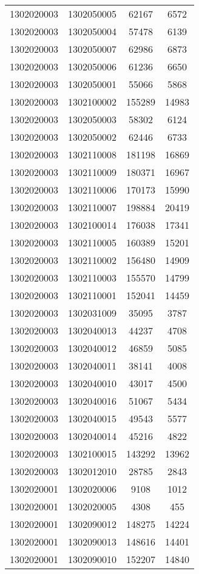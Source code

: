 \begin{longtable}[h]{llcc}
		1302020003 & 1302050005 & 62167 & 6572\\
		1302020003 & 1302050004 & 57478 & 6139\\
		1302020003 & 1302050007 & 62986 & 6873\\
		1302020003 & 1302050006 & 61236 & 6650\\
		1302020003 & 1302050001 & 55066 & 5868\\
		1302020003 & 1302100002 & 155289 & 14983\\
		1302020003 & 1302050003 & 58302 & 6124\\
		1302020003 & 1302050002 & 62446 & 6733\\
		1302020003 & 1302110008 & 181198 & 16869\\
		1302020003 & 1302110009 & 180371 & 16967\\
		1302020003 & 1302110006 & 170173 & 15990\\
		1302020003 & 1302110007 & 198884 & 20419\\
		1302020003 & 1302100014 & 176038 & 17341\\
		1302020003 & 1302110005 & 160389 & 15201\\
		1302020003 & 1302110002 & 156480 & 14909\\
		1302020003 & 1302110003 & 155570 & 14799\\
		1302020003 & 1302110001 & 152041 & 14459\\
		1302020003 & 1302031009 & 35095 & 3787\\
		1302020003 & 1302040013 & 44237 & 4708\\
		1302020003 & 1302040012 & 46859 & 5085\\
		1302020003 & 1302040011 & 38141 & 4008\\
		1302020003 & 1302040010 & 43017 & 4500\\
		1302020003 & 1302040016 & 51067 & 5434\\
		1302020003 & 1302040015 & 49543 & 5577\\
		1302020003 & 1302040014 & 45216 & 4822\\
		1302020003 & 1302100015 & 143292 & 13962\\
		1302020003 & 1302012010 & 28785 & 2843\\
		1302020001 & 1302020006 & 9108 & 1012\\
		1302020001 & 1302020005 & 4308 & 455\\
		1302020001 & 1302090012 & 148275 & 14224\\
		1302020001 & 1302090013 & 148616 & 14401\\
		1302020001 & 1302090010 & 152207 & 14840\\

\end{longtable}
